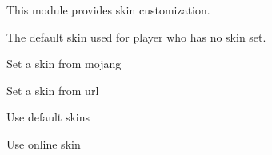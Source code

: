 This module provides skin customization.


\begin{Configuration}
    \item[default\_skins]{
        The default skin used for player who has no skin set.
    }
\end{Configuration}


\begin{example}{Set a skin from mojang}
\end{example}

\begin{example}{Set a skin from url}
\end{example}

\begin{example}{Use default skins}
\end{example}

\begin{example}{Use online skin}
\end{example}

